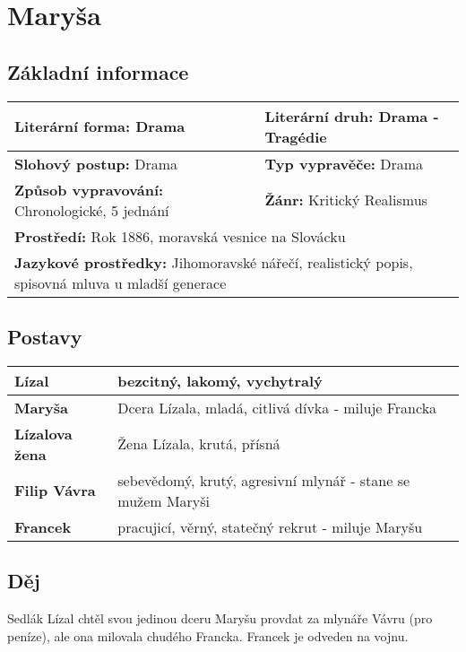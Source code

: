 \section{Maryša}
\subsection*{Základní informace}
\begin{tabularx}{\linewidth}{l|l}
    \textbf{Literární forma:} Drama                       & \textbf{Literární druh:} Drama - Tragédie                          \\
    \hline
    \textbf{Slohový postup:} Drama                        & \textbf{Typ vypravěče:} Drama                                      \\
    \hline
    \textbf{Způsob vypravování:} Chronologické, 5 jednání & \textbf{Žánr:} Kritický Realismus                                  \\
    \hline
    \multicolumn{2}{l}{\textbf{Prostředí:} Rok 1886, moravská vesnice na Slovácku}                                             \\
    \hline
    \multicolumn{2}{l}{\textbf{Jazykové prostředky:} Jihomoravské nářečí, realistický popis, spisovná mluva u mladší generace} \\
\end{tabularx}
\subsection*{Postavy}
\begin{tabularx}{\linewidth}{l|l}
    \textbf{Lízal}         & bezcitný, lakomý, vychytralý                                \\
    \hline
    \textbf{Maryša}        & Dcera Lízala, mladá, citlivá dívka - miluje Francka         \\
    \hline

    \textbf{Lízalova žena} & Žena Lízala, krutá, přísná                                  \\
    \hline
    \textbf{Filip Vávra}   & sebevědomý, krutý, agresivní mlynář - stane se mužem Maryši \\
    \hline
    \textbf{Francek}       & pracujicí, věrný, statečný rekrut - miluje Maryšu           \\
\end{tabularx}
\subsection*{Děj}
Sedlák Lízal chtěl svou jedinou dceru Maryšu provdat za mlynáře Vávru (pro peníze), ale ona milovala chudého Francka.
Francek je odveden na vojnu.

